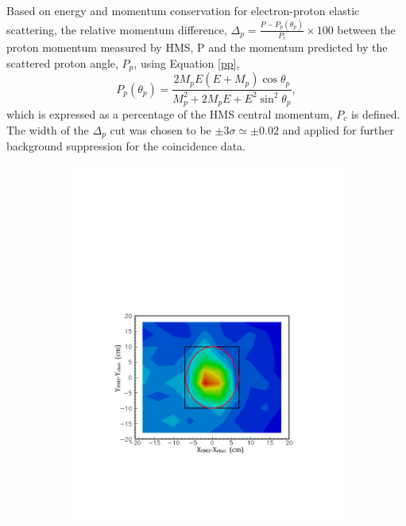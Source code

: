 \documentclass[12pt]{article}
\begin{document}
Based on energy and momentum conservation for electron-proton elastic scattering, the relative momentum difference, $\Delta_p=\frac{P-P_p(\theta_p)}{P_c}\times 100$ between the proton momentum measured by HMS, P and the momentum predicted by the scattered proton angle, $P_p$, using Equation \eqref{pp}, 
\begin{equation}
\label{pp}
P_p(\theta_p)=\frac{2M_pE(E+M_p)\cos {\theta_p}}{M_p^2+2M_pE+E^2\sin^2{\theta_p}},
\end{equation}
which is expressed as a percentage of the HMS central momentum, $P_c$ is defined. The width of the $\Delta_p$ cut was chosen to be $\pm 3 \sigma \simeq \pm 0.02$ and applied for further background suppression for the coincidence data.
\begin{figure}[htbp]
\centering
        \begin{subfigure}[htbp]{0.49\textwidth}
               \centering
               \includegraphics[width=\textwidth]{xydiff5}
                \label{xdiff}
      \end{subfigure}

\end{figure}
\end{document}
